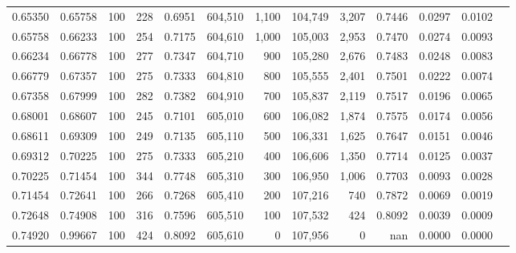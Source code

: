 \begin{tabular}{rrrrrrrrrrrrr}
0.65350 & 0.65758 &   100 & 228 &                                     0.6951 & 604,510 &   1,100 & 104,749 &   3,207 & 0.7446 & 0.0297 & 0.0102 \\
0.65758 & 0.66233 &   100 & 254 &                                     0.7175 & 604,610 &   1,000 & 105,003 &   2,953 & 0.7470 & 0.0274 & 0.0093 \\
0.66234 & 0.66778 &   100 & 277 &                                     0.7347 & 604,710 &     900 & 105,280 &   2,676 & 0.7483 & 0.0248 & 0.0083 \\
0.66779 & 0.67357 &   100 & 275 &                                     0.7333 & 604,810 &     800 & 105,555 &   2,401 & 0.7501 & 0.0222 & 0.0074 \\
0.67358 & 0.67999 &   100 & 282 &                                     0.7382 & 604,910 &     700 & 105,837 &   2,119 & 0.7517 & 0.0196 & 0.0065 \\
0.68001 & 0.68607 &   100 & 245 &                                     0.7101 & 605,010 &     600 & 106,082 &   1,874 & 0.7575 & 0.0174 & 0.0056 \\
0.68611 & 0.69309 &   100 & 249 &                                     0.7135 & 605,110 &     500 & 106,331 &   1,625 & 0.7647 & 0.0151 & 0.0046 \\
0.69312 & 0.70225 &   100 & 275 &                                     0.7333 & 605,210 &     400 & 106,606 &   1,350 & 0.7714 & 0.0125 & 0.0037 \\
0.70225 & 0.71454 &   100 & 344 &                                     0.7748 & 605,310 &     300 & 106,950 &   1,006 & 0.7703 & 0.0093 & 0.0028 \\
0.71454 & 0.72641 &   100 & 266 &                                     0.7268 & 605,410 &     200 & 107,216 &     740 & 0.7872 & 0.0069 & 0.0019 \\
0.72648 & 0.74908 &   100 & 316 &                                     0.7596 & 605,510 &     100 & 107,532 &     424 & 0.8092 & 0.0039 & 0.0009 \\
0.74920 & 0.99667 &   100 & 424 &                                     0.8092 & 605,610 &       0 & 107,956 &       0 &    nan & 0.0000 & 0.0000 \\
\bottomrule
\end{tabular}
